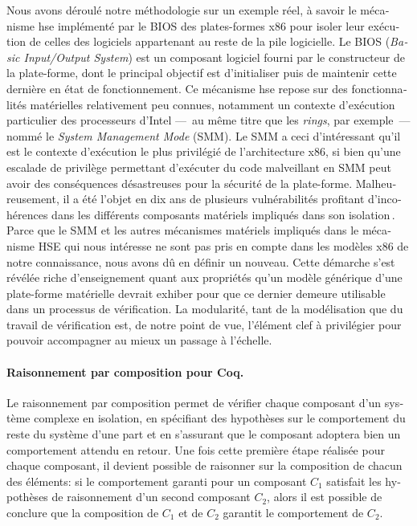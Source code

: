 \begin{otherlanguage}{french}
  Nous avons déroulé notre méthodologie sur un exemple réel, à savoir le
  mécanisme \ac{hse} implémenté par le BIOS des plates-formes x86 pour isoler
  leur exécution de celles des logiciels appartenant au reste de la pile
  logicielle.
  Le BIOS (\emph{Basic Input/Output System}) est un composant logiciel fourni
  par le constructeur de la plate-forme, dont le principal objectif est
  d’initialiser puis de maintenir cette dernière en état de fonctionnement.
  Ce mécanisme \ac{hse} repose sur des fonctionnalités matérielles relativement
  peu connues, notamment un contexte d’exécution particulier des processeurs
  d’Intel ---~au même titre que les \emph{rings}, par exemple~--- nommé le
  \emph{System Management Mode} (SMM).
  Le SMM a ceci d’intéressant qu’il est le contexte d’exécution le plus
  privilégié de l’architecture x86, si bien qu’une escalade de privilège
  permettant d’exécuter du code malveillant en SMM peut avoir des conséquences
  désastreuses pour la sécurité de la plate-forme.
  Malheureusement, il a été l’objet en dix ans de plusieurs vulnérabilités
  profitant d’incohérences dans les différents composants matériels impliqués
  dans son
  isolation\,\cite{duflot2009smram,wojtczuk2009smram,domas2015sinkhole}.
  Parce que le SMM et les autres mécanismes matériels impliqués dans le
  mécanisme HSE qui nous intéresse ne sont pas pris en compte dans les modèles
  x86 de notre connaissance, nous avons dû en définir un nouveau.
  Cette démarche s’est révélée riche d’enseignement quant aux propriétés qu’un
  modèle générique d’une plate-forme matérielle devrait exhiber pour que ce
  dernier demeure utilisable dans un processus de vérification.
  La modularité, tant de la modélisation que du travail de vérification est, de
  notre point de vue, l’élément clef à privilégier pour pouvoir accompagner au
  mieux un passage à l’échelle.

  \paragraph{Raisonnement par composition pour Coq.}
  Le raisonnement par composition permet de vérifier chaque composant d’un
  système complexe en isolation, en spécifiant des hypothèses sur le comportement
  du reste du système d’une part et en s’assurant que le composant adoptera bien
  un comportement attendu en retour.
  Une fois cette première étape réalisée pour chaque composant, il devient
  possible de raisonner sur la composition de chacun des éléments: si le
  comportement garanti pour un composant \( C_1 \) satisfait les hypothèses de
  raisonnement d’un second composant \( C_2 \), alors il est possible de
  conclure que la composition de \( C_1 \) et de \( C_2 \) garantit le
  comportement de \( C_2 \).


\end{otherlanguage}
